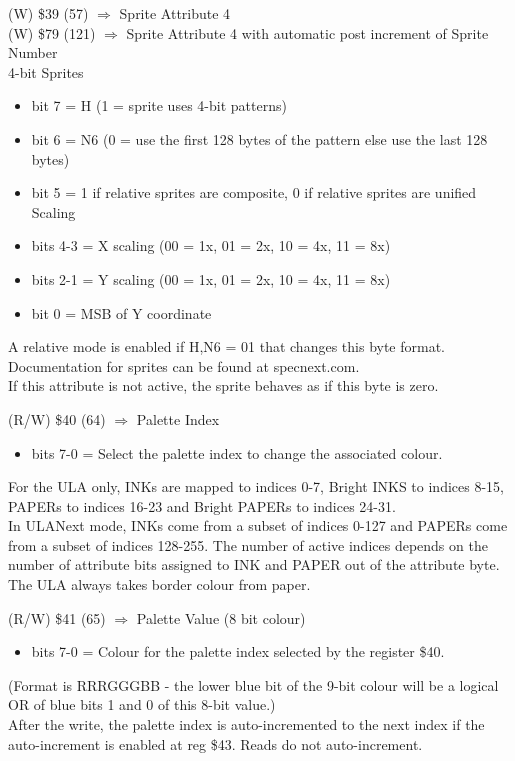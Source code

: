 (W) \$39 (57) $\Rightarrow$ Sprite Attribute 4\\
(W) \$79 (121) $\Rightarrow$ Sprite Attribute 4 with automatic post
increment of Sprite Number\\
4-bit Sprites
\begin{itemize}
\item[] bit 7 = H (1 = sprite uses 4-bit patterns)
\item[] bit 6 = N6 (0 = use the first 128 bytes of the pattern else
  use the last 128 bytes)
\item[] bit 5 = 1 if relative sprites are composite, 0 if relative
  sprites are unified Scaling
\item[] bits 4-3 = X scaling (00 = 1x, 01 = 2x, 10 = 4x, 11 = 8x)
\item[] bits 2-1 = Y scaling (00 = 1x, 01 = 2x, 10 = 4x, 11 = 8x)
\item[] bit 0 = MSB of Y coordinate
\end{itemize}
A relative mode is enabled if H,N6 = 01 that changes this byte
format. Documentation for sprites can be found at specnext.com.\\
If this attribute is not active, the sprite behaves as if this byte is
zero.

(R/W) \$40 (64) $\Rightarrow$ Palette Index
\begin{itemize}
\item[] bits 7-0 = Select the palette index to change the associated colour.
\end{itemize}
For the ULA only, INKs are mapped to indices 0-7, Bright INKS to
indices 8-15, PAPERs to indices 16-23 and Bright PAPERs to indices
24-31.\\
In ULANext mode, INKs come from a subset of indices 0-127 and PAPERs
come from a subset of indices 128-255. The number of active indices
depends on the number of attribute bits assigned to INK and PAPER out
of the attribute byte.  The ULA always takes border colour from paper.

(R/W) \$41 (65) $\Rightarrow$ Palette Value (8 bit colour)
\begin{itemize}
\item[] bits 7-0 = Colour for the palette index selected by the register \$40.
\end{itemize}
(Format is RRRGGGBB - the lower blue bit of the 9-bit colour will be a
logical OR of blue bits 1 and 0 of this 8-bit value.)\\
After the write, the palette index is auto-incremented to the next
index if the auto-increment is enabled at reg \$43. Reads do not
auto-increment.


